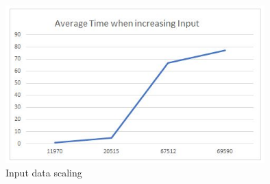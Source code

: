 \begin{figure}[ht]
\includegraphics[width=10cm]{Thesis/figures/figure5.JPG}
\caption{Input data scaling}
\label{fig:graph}
\end{figure}



